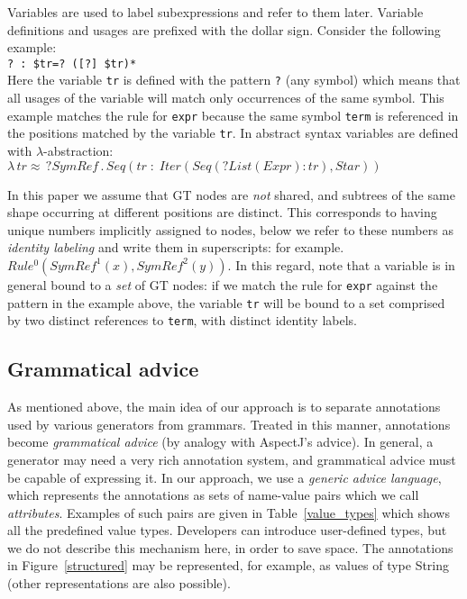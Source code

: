 \documentclass{IOS-Book-Article}     %
\newcommand{\abstr}[3]{\lambda \, #1 \approx #2 \,.\, #3}
\newcommand{\tabref}[1]{Table~\ref{#1}}
\newcommand{\figref}[1]{Figure~\ref{#1}}
\begin{document}
Variables are used to label subexpressions and refer to them later. Variable definitions and usages are prefixed with the dollar sign. Consider the following example:\\
\indent\lstinline!? : $tr=? ([?] $tr)*!\\
Here the variable \texttt{tr} is defined with the pattern \texttt{?} (any symbol) which means that all usages of the variable will match only occurrences of the same symbol. This example matches the rule for \texttt{expr} because the same symbol \texttt{term} is referenced in the positions matched by the variable \texttt{tr}. In abstract syntax variables are defined with $\lambda$-abstraction:\\\indent
$
\abstr{tr}{\,?SymRef}{Seq(tr\;:\;Iter(Seq(?List(Expr) : tr), Star))}
$

In this paper we assume that GT nodes are \emph{not} shared, and subtrees of the same shape occurring at different positions are distinct. This corresponds to having unique numbers implicitly assigned to nodes, below we refer to these numbers as \emph{identity labeling} and write them in superscripts: for example. $Rule^0(SymRef^1(x), SymRef^2(y))$. In this regard, note that a variable is in general bound to a \emph{set} of GT nodes: if we match the rule for \texttt{expr} against the pattern in the example above, the variable \texttt{tr} will be bound to a set comprised by two distinct references to \texttt{term}, with distinct identity labels.

\subsection{Grammatical advice}
As mentioned above, the main idea of our approach is to separate annotations used by various generators from grammars. Treated in this manner, annotations become \emph{grammatical advice} (by analogy with AspectJ's advice). In general, a generator may need a very rich annotation system, and grammatical advice must be capable of expressing it. In our approach, we use a \emph{generic advice language}, which represents the annotations as sets of name-value pairs which we call \emph{attributes}. Examples of such pairs are given in \tabref{value_types} which shows all the predefined value types. 
Developers can introduce user-defined types, but we do not describe this mechanism here, in order to save space. 
The annotations in \figref{structured} may be represented, for example, as values of type String (other representations are also possible).
\end{document}
